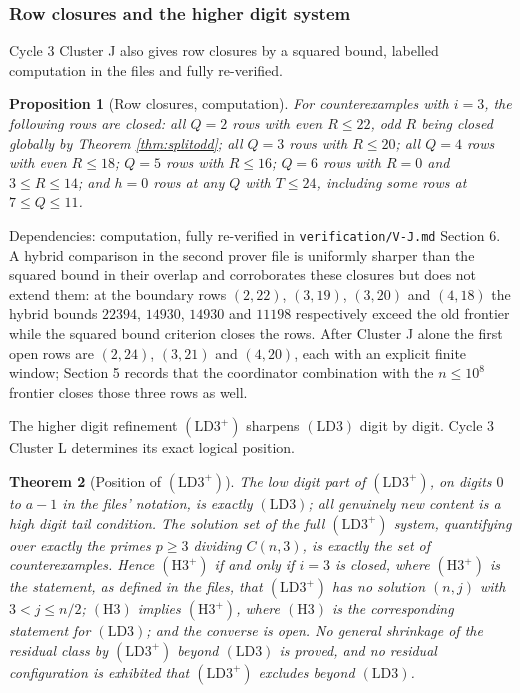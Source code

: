\documentclass[11pt]{article}
\newtheorem{theorem}{Theorem}[section]
\newtheorem{proposition}[theorem]{Proposition}
\theoremstyle{remark}
\newcommand{\LDthree}{\ensuremath{\mathrm{(LD3)}}}
\newcommand{\LDthreeplus}{\ensuremath{\mathrm{(LD3^+)}}}
\begin{document}
\subsubsection{Row closures and the higher digit system}

Cycle 3 Cluster J also gives row closures by a squared bound, labelled computation in the files and fully re-verified.

\begin{proposition}[Row closures, computation]
\label{prop:rows}
For counterexamples with $i=3$, the following rows are closed: all $Q=2$ rows with even $R\le 22$, odd $R$ being closed globally by Theorem \ref{thm:splitodd}; all $Q=3$ rows with $R\le 20$; all $Q=4$ rows with even $R\le 18$; $Q=5$ rows with $R\le 16$; $Q=6$ rows with $R=0$ and $3\le R\le 14$; and $h=0$ rows at any $Q$ with $T\le 24$, including some rows at $7\le Q\le 11$.
\end{proposition}

Dependencies: computation, fully re-verified in \texttt{verification/V-J.md} Section 6. A hybrid comparison in the second prover file is uniformly sharper than the squared bound in their overlap and corroborates these closures but does not extend them: at the boundary rows $(2,22)$, $(3,19)$, $(3,20)$ and $(4,18)$ the hybrid bounds $22394$, $14930$, $14930$ and $11198$ respectively exceed the old frontier while the squared bound criterion closes the rows. After Cluster J alone the first open rows are $(2,24)$, $(3,21)$ and $(4,20)$, each with an explicit finite window; Section 5 records that the coordinator combination with the $n\le 10^8$ frontier closes those three rows as well.

The higher digit refinement \LDthreeplus{} sharpens \LDthree{} digit by digit. Cycle 3 Cluster L determines its exact logical position.

\begin{theorem}[Position of \LDthreeplus{}]
\label{thm:ldplus}
The low digit part of \LDthreeplus{}, on digits $0$ to $a-1$ in the files' notation, is exactly \LDthree{}; all genuinely new content is a high digit tail condition. The solution set of the full \LDthreeplus{} system, quantifying over exactly the primes $p\ge 3$ dividing $C(n,3)$, is exactly the set of counterexamples. Hence $(\mathrm{H3^+})$ if and only if $i=3$ is closed, where $(\mathrm{H3^+})$ is the statement, as defined in the files, that \LDthreeplus{} has no solution $(n, j)$ with $3 < j \le n/2$; $(\mathrm{H3})$ implies $(\mathrm{H3^+})$, where $(\mathrm{H3})$ is the corresponding statement for \LDthree{}; and the converse is open. No general shrinkage of the residual class by \LDthreeplus{} beyond \LDthree{} is proved, and no residual configuration is exhibited that \LDthreeplus{} excludes beyond \LDthree{}.
\end{theorem}
\end{document}
